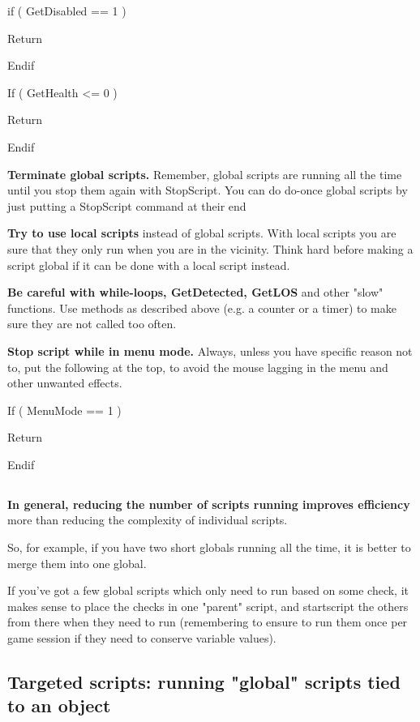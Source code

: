 \documentclass[
]{article}
\begin{document}
if ( GetDisabled == 1 )

Return

Endif

If ( GetHealth \textless= 0 )

Return

Endif

\textbf{Terminate global scripts.} Remember, global scripts are running
all the time until you stop them again with StopScript. You can do
do-once global scripts by just putting a StopScript command at their end



\textbf{Try to use local scripts} instead of global scripts. With local
scripts you are sure that they only run when you are in the vicinity.
Think hard before making a script global if it can be done with a local
script instead.

\textbf{Be careful with while-loops, GetDetected, GetLOS} and other
"slow" functions. Use methods as described above (e.g. a counter or a
timer) to make sure they are not called too often.

\textbf{Stop script while in menu mode.} Always, unless you have
specific reason not to, put the following at the top, to avoid the mouse
lagging in the menu and other unwanted effects.

If ( MenuMode == 1 )

Return

Endif

\hypertarget{section-12}{%
\subsection{}\label{section-12}}

\textbf{In general, reducing the number of scripts running improves
efficiency} more than reducing the complexity of individual scripts.

So, for example, if you have two short globals running all the time, it
is better to merge them into one global.

If you've got a few global scripts which only need to run based on some
check, it makes sense to place the checks in one "parent" script, and
startscript the others from there when they need to run (remembering to
ensure to run them once per game session if they need to conserve
variable values).

\hypertarget{targeted-scripts-running-global-scripts-tied-to-an-object}{%
\subsection{\texorpdfstring{\hfill\break
Targeted scripts: running "global" scripts tied to an
object}{ Targeted scripts: running "global" scripts tied to an object}}\label{targeted-scripts-running-global-scripts-tied-to-an-object}}
\end{document}
